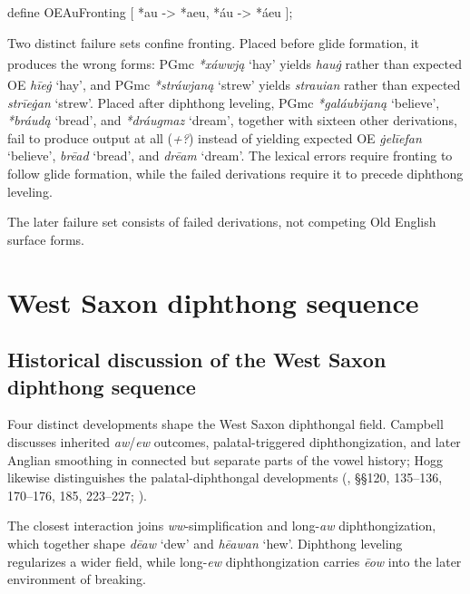 \documentclass[
  british,
  a4paper,
  openany]{book}
\providecommand{\Pred}[1]{\textsuperscript{\dag}\emph{#1}}
\providecommand{\Recon}[1]{\emph{*#1}}
{\catcode`→=\active \global\def→{\ensuremath{\rightarrow}}}
\providecommand{\Pred}[1]{\textsuperscript{\dag}\emph{#1}}
\providecommand{\Recon}[1]{\emph{*#1}}
{\catcode`→=\active \global\def→{\ensuremath{\rightarrow}}}
\begin{document}
\begin{ReaderFacingFoma}
define OEAuFronting [
    {*au} -> {*aeu},
    {*áu} -> {*áeu}
];
\end{ReaderFacingFoma}

Two distinct failure sets confine fronting. Placed before glide
formation, it produces the wrong forms: PGmc \Recon{xáwwją} `hay' yields
\Pred{hauġ} rather than expected OE \emph{hīeġ} `hay', and PGmc
\Recon{stráwjaną} `strew' yields \Pred{strauian} rather than expected
\emph{strīeġan} `strew'. Placed after diphthong leveling, PGmc
\Recon{galáubijaną} `believe', \Recon{bráudą} `bread', and
\Recon{dráugmaz} `dream', together with sixteen other derivations, fail
to produce output at all (\emph{+?}) instead of yielding expected OE
\emph{ġelīefan} `believe', \emph{brēad} `bread', and \emph{drēam}
`dream'. The lexical errors require fronting to follow glide formation,
while the failed derivations require it to precede diphthong leveling.

The later failure set consists of failed derivations, not competing Old
English surface forms.

\newpage

\section{West Saxon diphthong
sequence}\label{west-saxon-diphthong-sequence}

\subsection{Historical discussion of the West Saxon diphthong
sequence}\label{historical-discussion-of-the-west-saxon-diphthong-sequence}

Four distinct developments shape the West Saxon diphthongal field.
Campbell discusses inherited \emph{aw}/\emph{ew} outcomes,
palatal-triggered diphthongization, and later Anglian smoothing in
connected but separate parts of the vowel history; Hogg likewise
distinguishes the palatal-diphthongal developments
(,
§§120, 135--136, 170--176, 185, 223--227; ).

The closest interaction joins \emph{ww}-simplification and
long-\emph{aw} diphthongization, which together shape \emph{dēaw} `dew'
and \emph{hēawan} `hew'. Diphthong leveling regularizes a wider field,
while long-\emph{ew} diphthongization carries \emph{ēow} into the later
environment of breaking.
\end{document}
